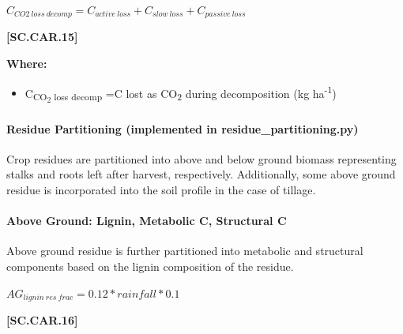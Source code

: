     \begin{center}
\(C_{CO2\ loss\ decomp}=C_{active\ loss}+C_{slow\ loss}+C_{passive\ loss}\)

    \end{center}
        \vspace{0.5cm} 
    
            {\raggedleft \textbf{[SC.CAR.15]}\par}
            \vspace{0.5cm}

        \textbf{Where:}

        \begin{itemize}
            \item C\textsubscript{CO\textsubscript{2} loss decomp} =C lost as CO\textsubscript{2} during decomposition (kg ha\textsuperscript{-1})
        \end{itemize}
        \vspace{0.5cm}

\paragraph{Residue Partitioning (implemented in residue\_partitioning.py)}
\vspace{0.2cm}

Crop residues are partitioned into above and below ground biomass representing stalks and roots left after harvest, respectively. Additionally, some above ground residue is incorporated into the soil profile in the case of tillage.
\vspace{0.2cm}

\paragraph{Above Ground: Lignin, Metabolic C, Structural C}
\vspace{0.2cm}

Above ground residue is further partitioned into metabolic and structural components based on the lignin composition of the residue.
        \vspace{0.5cm}


    \begin{center}
\(AG_{lignin\ res\ frac}=0.12 * rainfall * 0.1\)
    \end{center}
        \vspace{0.5cm} 
    
            {\raggedleft \textbf{[SC.CAR.16]}\par}
            \vspace{0.5cm}

